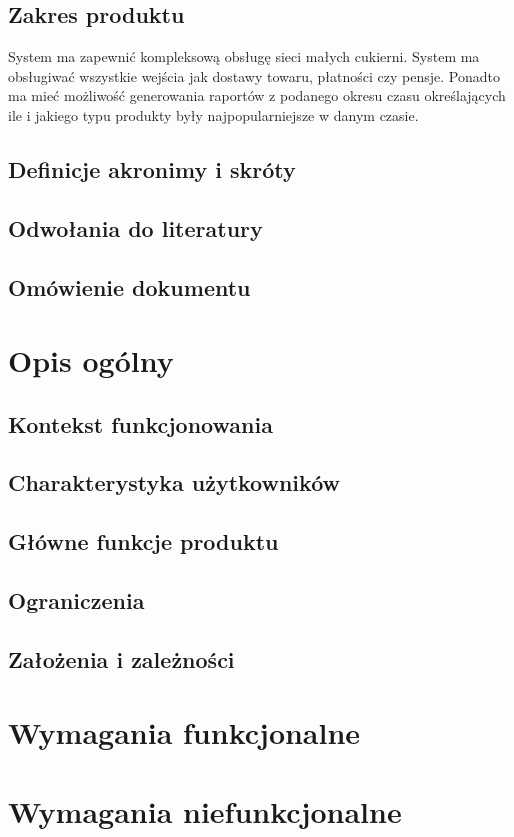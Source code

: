 \documentclass[16pt,a4paper]{article}
\begin{document}
\subsection{Zakres produktu}
System ma zapewnić kompleksową obsługę sieci małych cukierni. System ma obsługiwać wszystkie wejścia jak dostawy towaru, płatności czy pensje. Ponadto ma mieć możliwość generowania raportów z podanego okresu czasu określających ile i jakiego typu produkty były najpopularniejsze w danym czasie.      
\subsection{Definicje akronimy i skróty}
\subsection{Odwołania do literatury}
\subsection{Omówienie dokumentu}
\section{Opis ogólny}
\subsection{Kontekst funkcjonowania}
\subsection{Charakterystyka użytkowników}
\subsection{Główne funkcje produktu}
\subsection{Ograniczenia}
\subsection{Założenia i zależności}
\section{Wymagania funkcjonalne}
\section{Wymagania niefunkcjonalne}
\end{document}

